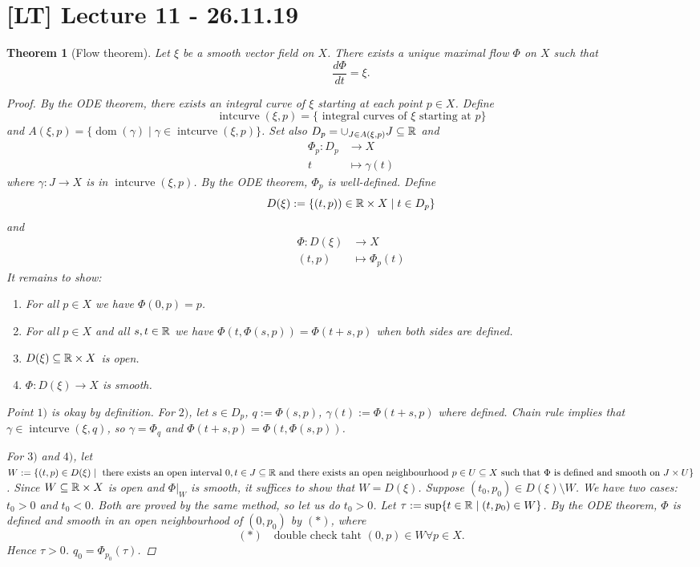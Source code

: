 \documentclass[A4paper, british]{amsart}
\theoremstyle{darkgreentheorem}
\newtheorem{thm}{Theorem}[section]
\theoremstyle{darkbluedefinition}
\theoremstyle{darkredexample}
\theoremstyle{remark}
\newcommand{\1}{\mathbbm{1}}
\newcommand{\tms}{\times}
\newcommand{\sub}{\subseteq}
\begin{document}
\section{[LT] Lecture 11 - 26.11.19}

\begin{thm}[Flow theorem]
    Let $\xi$ be a smooth vector field on $X$.
    There exists a unique maximal flow $\Phi$ on $X$ such that
    \[ \frac{d\Phi}{dt}=\xi .\]
    \begin{proof}
	By the ODE theorem, there exists an integral curve of $\xi$ starting at each point $p\in X$.
	Define
	\[ \operatorname{intcurve}(\xi,p)=\{ \text{ integral curves of }\xi\text{ starting at }p\} \]
	and $A(\xi,p)=\{\operatorname{dom}(\gamma)\mid \gamma\in \operatorname{intcurve}(\xi,p)\}$.
	Set also $D_{p}=\cup_{J\in A(\xi,p)}J \sub \R$ and
	\begin{align*}
	    \Phi_{p} \colon D_{p} & \to X \\
	    t & \mapsto \gamma(t) 
	\end{align*}
	where $\gamma\colon J\to X$ is in $\operatorname{intcurve}(\xi,p)$.
	By the ODE theorem, $\Phi_{p}$ is well-defined.
	Define
	\[ D(\xi):=\{ (t,p))\in \R\tms X\mid t\in D_{p} \}\]
	and
	\begin{align*}
	    \Phi\colon D(\xi) & \to X \\
	    (t,p) & \mapsto \Phi_{p}(t)
	\end{align*}
	It remains to show:
	\begin{enumerate}
	    \item For all $p\in X$ we have $\Phi(0,p)=p$.
	    \item For all $p\in X$ and all $s,t\in \mathbb{R}$ we have $\Phi(t,\Phi(s,p))=\Phi(t+s,p)$ when both sides are defined.
	    \item $D(\xi)\sub \R\tms X$ is open.
	    \item $\Phi\colon D(\xi)\to X$ is smooth.
	\end{enumerate}
	Point $1)$ is okay by definition.
	For $2)$, let $s\in D_{p}$, $q:=\Phi(s,p)$, $\gamma(t):=\Phi(t+s,p)$ where defined.
	Chain rule implies that $\gamma\in \operatorname{intcurve}(\xi,q)$, so $\gamma=\Phi_{q}$ and $\Phi(t+s,p)=\Phi(t,\Phi(s,p))$.

	For $3)$ and $4)$, let $W:=\{ (t,p)\in D(\xi)\mid \text{ there exists an open interval }0,t\in J\sub \R\text{ and there exists an open neighbourhood }p\in U\sub X \text{ such that } \Phi \text{ is defined and smooth on }J\tms U \}$.
	Since $W\sub \R\tms X$ is open and $\Phi|_{W}$ is smooth, it suffices to show that $W=D(\xi)$.
	Suppose $(t_{0},p_{0})\in D(\xi)\setminus W$.
	We have two cases: $t_{0}>0$ and $t_{0}<0$.
	Both are proved by the same method, so let us do $t_{0}>0$.
	Let $\tau:=\sup\{t\in \mathbb{R}\mid (t,p_{0})\in W \}$.
	By the ODE theorem, $\Phi$ is defined and smooth in an open neighbourhood of $(0,p_{0})$ by $(*)$, where
	\[ (*)\quad \text{double check taht }(0,p)\in W \forall p\in X.\]
	Hence $\tau>0$.
	$q_{0}=\Phi_{p_{0}}(\tau)$.


\end{proof}
\end{thm}
\end{document}
